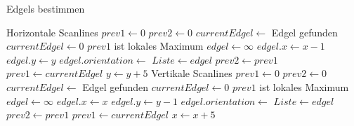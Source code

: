 \begin{algorithm}
	\caption{Edgels bestimmen}
	\label{src:analyseFindedgels}
	\begin{algorithmic}[1]
			\Comment Horizontale Scanlines
				\State $prev1 \gets 0$
				\State $prev2 \gets 0$
					\State $currentEdgel \gets$ 
						\Comment Edgel gefunden
					\Else
						\State $currentEdgel \gets 0$
					\EndIf 
						\Comment $prev1$ ist lokales Maximum
						\State $edgel \gets \infty$
						\State $edgel.x \gets x - 1$
						\State $edgel.y \gets y$
						\State $edgel.orientation \gets$ 
						\State $Liste \gets edgel$
					\EndIf
					\State $prev2 \gets prev1$
					\State $prev1 \gets currentEdgel$
				\EndFor
				\State $y \gets y + 5$
			\EndFor
			\Statex
			\Comment Vertikale Scanlines
				\State $prev1 \gets 0$
				\State $prev2 \gets 0$
					\State $currentEdgel \gets$ 
						\Comment Edgel gefunden
					\Else
						\State $currentEdgel \gets 0$
					\EndIf
						\Comment $prev1$ ist lokales Maximum
						\State $edgel \gets \infty$
						\State $edgel.x \gets x$
						\State $edgel.y \gets y - 1$
						\State $edgel.orientation \gets$ 
						\State $Liste \gets edgel$
					\EndIf
					\State $prev2 \gets prev1$
					\State $prev1 \gets currentEdgel$
				\EndFor
				\State $x \gets x + 5$
			\EndFor
		\EndProcedure
	\end{algorithmic}
\end{algorithm}
